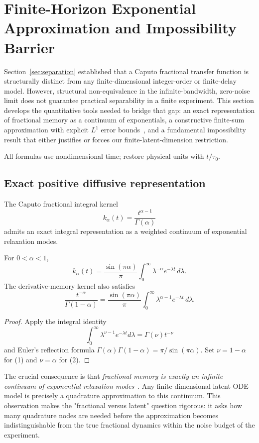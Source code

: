 \section{Finite-Horizon Exponential Approximation and Impossibility Barrier}
\label{sec:approximation}

Section~\ref{sec:separation} established that a Caputo fractional transfer function is structurally distinct from any finite-dimensional integer-order or finite-delay model. However, structural non-equivalence in the infinite-bandwidth, zero-noise limit does not guarantee practical separability in a finite experiment. This section develops the quantitative tools needed to bridge that gap: an exact representation of fractional memory as a continuum of exponentials, a constructive finite-sum approximation with explicit $L^1$ error bounds~\cite{K01,K03,K04,K05,K06}, and a fundamental impossibility result that either justifies or forces our finite-latent-dimension restriction.

All formulas use nondimensional time; restore physical units with \(t/\tau_0\).

\subsection{Exact positive diffusive representation}

The Caputo fractional integral kernel
\[
k_\alpha(t) = \frac{t^{\alpha-1}}{\Gamma(\alpha)}
\]
admits an exact integral representation as a weighted continuum of exponential relaxation modes.

\begin{theorem}
\label{thm:T8}
For \(0 < \alpha < 1\),
\[
\boxed{
k_\alpha(t) = \frac{\sin(\pi\alpha)}{\pi}
\int_0^\infty \lambda^{-\alpha} e^{-\lambda t} \, d\lambda.
}
\tag{1}
\]
The derivative-memory kernel also satisfies
\[
\boxed{
\frac{t^{-\alpha}}{\Gamma(1-\alpha)}
= \frac{\sin(\pi\alpha)}{\pi}
\int_0^\infty \lambda^{\alpha-1} e^{-\lambda t} \, d\lambda.
}
\tag{2}
\]
\end{theorem}

\begin{proof}
Apply the integral identity
\[
\int_0^\infty \lambda^{\nu-1} e^{-\lambda t} d\lambda = \Gamma(\nu) t^{-\nu}
\]
and Euler's reflection formula \(\Gamma(\alpha)\Gamma(1-\alpha) = \pi / \sin(\pi\alpha)\). Set \(\nu = 1-\alpha\) for (1) and \(\nu = \alpha\) for (2).
\end{proof}

The crucial consequence is that \emph{fractional memory is exactly an infinite continuum of exponential relaxation modes}~\cite{K02,F02,F03,F04}. Any finite-dimensional latent ODE model is precisely a quadrature approximation to this continuum. This observation makes the "fractional versus latent" question rigorous: it asks how many quadrature nodes are needed before the approximation becomes indistinguishable from the true fractional dynamics within the noise budget of the experiment.

